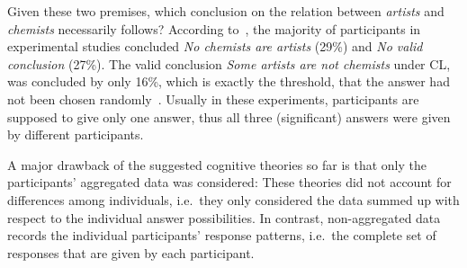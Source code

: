 \documentclass[12pt]{article}
\begin{document}
Given these
two premises, which conclusion on the relation between \emph{artists} and \emph{chemists} necessarily follows?
According to~\cite{khemlani:2012}, the majority of participants in experimental studies
concluded \emph{No chemists are artists} (29\%) and \emph{No valid conclusion} (27\%). The valid conclusion \emph{Some artists are not chemists}
under CL, was concluded by only 16\%, which is exactly the threshold, that the answer had not been chosen randomly~\cite{khemlani:2012}.
Usually in these experiments, participants are supposed to give only one answer, thus all three (significant) answers
were given by different participants. 

A major drawback of the suggested cognitive theories so far is that only the participants'
aggregated data was considered: These theories did not account for differences
among individuals, i.e.\ they only considered the data summed up with respect to the individual answer possibilities. In contrast, non-aggregated data records the individual participants' response patterns, i.e.\ the complete set of responses that are given by each participant.
\end{document}
